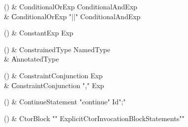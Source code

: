 \begin{bbgrammarappendix}

() & ConditionalOrExp \label{prod:ConditionalOrExp}  \: ConditionalAndExp  \\

 &    \| ConditionalOrExp \xcd"||" ConditionalAndExp \\

\end{bbgrammarappendix}

\begin{bbgrammarappendix}

() & ConstantExp \label{prod:ConstantExp}  \: Exp  \\


\end{bbgrammarappendix}

\begin{bbgrammarappendix}

() & ConstrainedType \label{prod:ConstrainedType}  \: NamedType  \\

 &    \| AnnotatedType \\

\end{bbgrammarappendix}

\begin{bbgrammarappendix}

() & ConstraintConjunction \label{prod:ConstraintConjunction}  \: Exp  \\

 &    \| ConstraintConjunction \xcd"," Exp \\

\end{bbgrammarappendix}

\begin{bbgrammarappendix}

() & ContinueStatement \label{prod:ContinueStatement}  \: \xcd"continue" Id\opt \xcd";"  \\


\end{bbgrammarappendix}

\begin{bbgrammarappendix}

() & CtorBlock \label{prod:CtorBlock}  \: \xcd"{" ExplicitCtorInvocation\opt BlockStatements\opt \xcd"}"  \\


\end{bbgrammarappendix}


